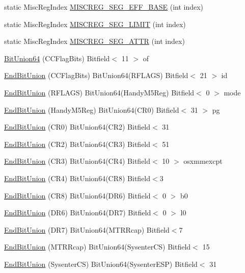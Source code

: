 \begin{DoxyCompactItemize}
static MiscRegIndex \hyperlink{namespaceX86ISA_a48969e78833727c474e77163559d3cc0}{MISCREG\_\-SEG\_\-EFF\_\-BASE} (int index)
\item 
static MiscRegIndex \hyperlink{namespaceX86ISA_af93c7fd7ac0d329975952ac0c2a97f98}{MISCREG\_\-SEG\_\-LIMIT} (int index)
\item 
static MiscRegIndex \hyperlink{namespaceX86ISA_abb8ec3742a54286da349c98a1a9c9755}{MISCREG\_\-SEG\_\-ATTR} (int index)
\item 
\hyperlink{namespaceX86ISA_add2763aec7e48b7f1017b5fe13442001}{BitUnion64} (CCFlagBits) Bitfield$<$ 11 $>$ of
\item 
\hyperlink{namespaceX86ISA_a5a5281caa3a9093cbf9cf11cd0707381}{EndBitUnion} (CCFlagBits) BitUnion64(RFLAGS) Bitfield$<$ 21 $>$ id
\item 
\hyperlink{namespaceX86ISA_ac07994f7a93f2a18d925d25590d4a9f6}{EndBitUnion} (RFLAGS) BitUnion64(HandyM5Reg) Bitfield$<$ 0 $>$ mode
\item 
\hyperlink{namespaceX86ISA_ad8865619d442f312bd5bab7adadf3d86}{EndBitUnion} (HandyM5Reg) BitUnion64(CR0) Bitfield$<$ 31 $>$ pg
\item 
\hyperlink{namespaceX86ISA_aad28ecf95b3da4ad6726c2b56e0fa95a}{EndBitUnion} (CR0) BitUnion64(CR2) Bitfield$<$ 31
\item 
\hyperlink{namespaceX86ISA_a6fb30c9c1ad6d18a04268626472a30d8}{EndBitUnion} (CR2) BitUnion64(CR3) Bitfield$<$ 51
\item 
\hyperlink{namespaceX86ISA_aaf77e09150e1b34a14d4f96e956c3f8c}{EndBitUnion} (CR3) BitUnion64(CR4) Bitfield$<$ 10 $>$ osxmmexcpt
\item 
\hyperlink{namespaceX86ISA_a7e4fd57e9e02956b923ac0120e86ea17}{EndBitUnion} (CR4) BitUnion64(CR8) Bitfield$<$3
\item 
\hyperlink{namespaceX86ISA_a4090a87d3d8e1fc8eef9350d8f1aaf5f}{EndBitUnion} (CR8) BitUnion64(DR6) Bitfield$<$ 0 $>$ b0
\item 
\hyperlink{namespaceX86ISA_aeeaa00abc970a64acc15c9cd060080d7}{EndBitUnion} (DR6) BitUnion64(DR7) Bitfield$<$ 0 $>$ l0
\item 
\hyperlink{namespaceX86ISA_a7aedb651d37934b8045347d6e6cc030e}{EndBitUnion} (DR7) BitUnion64(MTRRcap) Bitfield$<$7
\item 
\hyperlink{namespaceX86ISA_af2952321021f4fc6fbe7dac40d855d25}{EndBitUnion} (MTRRcap) BitUnion64(SysenterCS) Bitfield$<$ 15
\item 
\hyperlink{namespaceX86ISA_a43a50aa605aeac723bd1a4a2dc118e56}{EndBitUnion} (SysenterCS) BitUnion64(SysenterESP) Bitfield$<$ 31

\end{DoxyCompactItemize}
